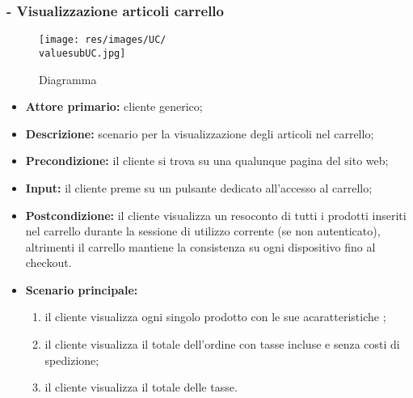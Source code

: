 \subsubsection{ - Visualizzazione articoli carrello}
\begin{figure}[H]
    \centering
    \texttt{[image: res/images/UC/\\valuesubUC.jpg]}
    \caption{Diagramma }
\end{figure}
\begin{itemize}
    \item \textbf{Attore primario:} cliente generico;
    \item \textbf{Descrizione:} scenario per la visualizzazione degli articoli nel carrello;
    \item \textbf{Precondizione:} il cliente si trova su una qualunque pagina del sito web;
    \item \textbf{Input:} il cliente preme su un pulsante dedicato all'accesso al carrello;
    \item \textbf{Postcondizione:} il cliente visualizza un resoconto di tutti i prodotti inseriti nel carrello durante la sessione di utilizzo corrente (se non autenticato), altrimenti il carrello mantiene la consistenza su ogni dispositivo fino al checkout.
    \item \textbf{Scenario principale:}
          \begin{enumerate}
              \item il cliente visualizza ogni singolo prodotto con le sue acaratteristiche ;
              \item il cliente visualizza il totale dell'ordine con tasse incluse e senza costi di spedizione;
              \item il cliente visualizza il totale delle tasse.
          \end{enumerate}
\end{itemize}

\stepsubsubUserCase
